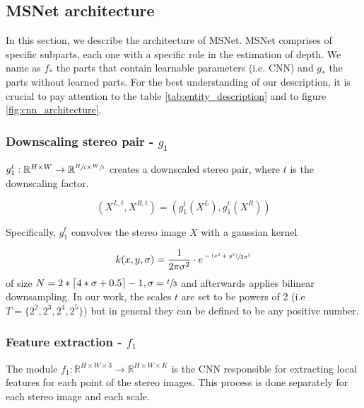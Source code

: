\documentclass[10pt]{article}
\begin{document}
\begin{figure}[t]
\label{fig:multiscale_importance_2D}  
\vspace{-3pt}      
\end{figure}

\subsection{MSNet architecture}

In this section, we describe the architecture of MSNet. MSNet comprises of specific subparts, each one with a specific role in the estimation of depth. We name as $f_*$ the parts that contain learnable parameters (i.e. CNN) and $g_*$ the parts without learned parts. For the best understanding of our description, it is crucial to pay attention to the table \ref{tab:entity_description} and to figure \ref{fig:cnn_architecture}.

\subsubsection{Downscaling stereo pair - $g_1$}

$g_1^t : \mathbb{R}^{H \times W} \rightarrow \mathbb{R}^{\sfrac{H}{t} \times \sfrac{W}{t}}$ creates a downscaled stereo pair, where $t$ is the downscaling factor. 

$$(X^{L,t}, X^{R,t}) = (g_1^t(X^L), g_1^t(X^R)) $$

Specifically, $g_1^t$ convolves the stereo image $X$ with a gaussian kernel 

$$k(x, y, \sigma) = \frac{1}{2\pi\sigma^2} \cdot e^{\sfrac{-(x^2 + y^2)}{2\sigma^2}}$$ of size $N = 2 * \lceil 4*\sigma + 0.5 \rceil - 1, \sigma = \sfrac{t}{3}$ and afterwards applies bilinear downsampling. In our work, the scales $t$ are set to be powers of 2 (i.e $ T = \{ 2^2, 2^3, 2^4, 2^5 \}$) but in general they can be defined to be any positive number. 


\subsubsection{Feature extraction - $f_1$}

The module $f_1: \mathbb{R}^{H \times W \times 3} \rightarrow \mathbb{R}^{H \times W \times K}$ is the CNN responsible for extracting local features for each point of the stereo images. This process is done separately for each stereo image and each scale.
\end{document}
